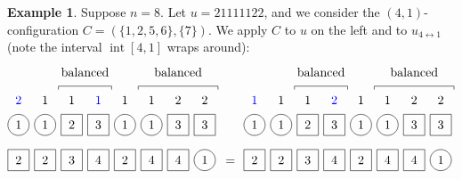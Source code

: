 \documentclass[reqno]{amsart}
\newcommand{\0}{\phantom{c}}
\DeclareMathOperator{\inter}{int} %
\theoremstyle{plain}
\theoremstyle{definition}
\newtheorem{example}[thm]{Example}
\numberwithin{equation}{section}
\begin{document}
\begin{example}
Suppose $n = 8$.
Let $u = 21111122$, and we consider the $(4,1)$-configuration $C = (\{1,2,5,6\},\{7\})$.
We apply $C$ to $u$ on the left and to $u_{4\leftrightarrow1}$ (note the interval $\inter[4,1]$ wraps around):
\[
\begin{tikzpicture}[baseline=25]
  \def\sc{0.75}   %
  \def\lll{2.7}   %
  \def\ll{2}   %
  \def\l{1}   %
  \node[color=blue] at (1*\sc,\lll) {$2$};
  \node[color=blue] at (4*\sc,\lll) {$1$};
  \foreach \i in {2,3,5,6} { \node at (\i*\sc,\lll){$1$}; }
  \foreach \i in {7,8} { \node at (\i*\sc,\lll){$2$}; }
  \foreach \i in {1,2,5,6} { \draw (\i*\sc,\ll) circle (0.3); }
  \foreach \i in {3,4,7,8} { \draw (\i*\sc-.3,\ll-.3) rectangle +(0.6,+0.6); }
  \foreach \i in {1,2,5,6} { \node at (\i*\sc,\ll) {$1$}; }
  \foreach \i in {3} { \node at (\i*\sc,\ll) {$2$}; }
  \foreach \i in {4,7,8} { \node at (\i*\sc,\ll) {$3$}; }
  \foreach \i in {8} { \draw (\i*\sc,\l) circle (0.3); }
  \foreach \i in {1,2,3,4,5,6,7} { \draw (\i*\sc-.3,\l-.3) rectangle +(0.6,+0.6); }
  \foreach \i in {4,6,7} { \node at (\i*\sc,\l) {$4$}; }
  \foreach \i in {8} { \node at (\i*\sc,\l) {$1$}; }
  \foreach \i in {3} { \node at (\i*\sc,\l) {$3$}; }
  \foreach \i in {1,2,5} { \node at (\i*\sc,\l) {$2$}; }
  \draw (2.5*\sc,3) -- (2.5*\sc,3.1) -- (4.5*\sc,3.1) -- (4.5*\sc,3);
  \node at (3.5*\sc,3.5) {balanced};
  \draw (5.5*\sc,3) -- (5.5*\sc,3.1) -- (8.5*\sc,3.1) -- (8.5*\sc,3);
  \node at (7.0*\sc,3.5) {balanced};
\end{tikzpicture}
\hspace{3pt} = \hspace{4pt}
\begin{tikzpicture}[baseline=25]
  \def\sc{0.75}   %
  \def\lll{2.7}   %
  \def\ll{2}   %
  \def\l{1}   %
  \node[color=blue] at (4*\sc,\lll) {$2$};
  \node[color=blue] at (1*\sc,\lll) {$1$};
  \foreach \i in {2,3,5,6} { \node at (\i*\sc,\lll){$1$}; }
  \foreach \i in {7,8} { \node at (\i*\sc,\lll){$2$}; }
  \foreach \i in {1,2,5,6} { \draw (\i*\sc,\ll) circle (0.3); }
  \foreach \i in {3,4,7,8} { \draw (\i*\sc-.3,\ll-.3) rectangle +(0.6,+0.6); }
  \foreach \i in {1,2,5,6} { \node at (\i*\sc,\ll) {$1$}; }
  \foreach \i in {3} { \node at (\i*\sc,\ll) {$2$}; }
  \foreach \i in {4,7,8} { \node at (\i*\sc,\ll) {$3$}; }
  \foreach \i in {8} { \draw (\i*\sc,\l) circle (0.3); }
  \foreach \i in {1,2,3,4,5,6,7} { \draw (\i*\sc-.3,\l-.3) rectangle +(0.6,+0.6); }
  \foreach \i in {4,6,7} { \node at (\i*\sc,\l) {$4$}; }
  \foreach \i in {8} { \node at (\i*\sc,\l) {$1$}; }
  \foreach \i in {3} { \node at (\i*\sc,\l) {$3$}; }
  \foreach \i in {1,2,5} { \node at (\i*\sc,\l) {$2$}; }
  \draw (2.5*\sc,3) -- (2.5*\sc,3.1) -- (4.5*\sc,3.1) -- (4.5*\sc,3);
  \node at (3.5*\sc,3.5) {balanced};
  \draw (5.5*\sc,3) -- (5.5*\sc,3.1) -- (8.5*\sc,3.1) -- (8.5*\sc,3);
  \node at (7.0*\sc,3.5) {balanced};
\end{tikzpicture}
\]
\end{example}
\end{document}
